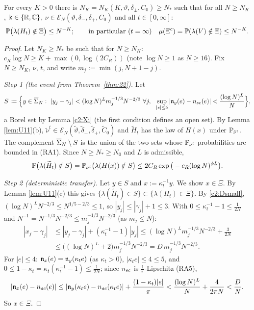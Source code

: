 \begin{lemma}\label{lem:goodC}
For every $K>0$ there is $N_K=N_K(K,\vartheta,\delta_\pm,C_0)\ge N_*$ such that for all $N\ge N_K$, $\K\in\{\R,\C\}$, $\nu\in\mathcal E_N(\vartheta,\delta_-,\delta_+,C_0)$ and all $t\in[0,\infty]$:
\[
\P\big(\lambda(H_t)\notin\Xi\big)\le N^{-K};\qquad\text{in particular (}t=\infty\text{)}\quad\mu(\Xi^c)=\P(\lambda(V)\notin\Xi)\le N^{-K}.
\]
\end{lemma}

\begin{proof}
Let $N_K\ge N_*$ be such that for $N\ge N_K$: $c_R\log N\ge K+\max(0,\log(2C_R))$ (note $\log N\ge1$ as $N\ge16$). Fix $N\ge N_K$, $\nu$, $t$, and write $m_j:=\min(j,N+1-j)$.

\emph{Step 1 (the event from Theorem~\ref{thm:22}).} Let
\[
S:=\Big\{y\in\cSig:\ |y_j-\gamma_j|<(\log N)^Lm_j^{-1/3}N^{-2/3}\ \forall j,\ \ \sup_{|e|\le5}|\fn_y(e)-\nsc(e)|<\frac{(\log N)^L}N\Big\},
\]
a Borel set by Lemma \ref{c2:Xi} (the first condition defines an open set). By Lemma \ref{lem:U11}(b), $\tilde\nu^t\in\mathcal E_N(\tilde\vartheta,\tilde\delta_-,\tilde\delta_+,\tilde C_0)$ and $\widetilde H_t$ has the law of $H(x)$ under $\PP_{\tilde\nu^t}$.
The complement $\cSig\setminus S$ is the union of the two sets whose $\PP_{\tilde\nu^t}$-probabilities are bounded in (RA1). Since $N\ge N_*\ge N_0$ and $L$ is admissible,
\[
\P\big(\lambda(\widetilde H_t)\notin S\big)=\PP_{\tilde\nu^t}\big(\lambda(H(x))\notin S\big)\le2C_R\exp\big(-c_R(\log N)^{\phi L}\big).
\]

\emph{Step 2 (deterministic transfer).} Let $y\in S$ and $x:=\kappa_t^{-1}y$. We show $x\in\Xi$. By Lemma \ref{lem:U11}(c) this gives $\{\lambda(\widetilde H_t)\in S\}\subset\{\lambda(H_t)\in\Xi\}$.
By \eqref{c2:Dsmall}, $(\log N)^LN^{-2/3}\le N^{1/5-2/3}\le1$, so $|y_j|\le|\gamma_j|+1\le3$. With $0\le\kappa_t^{-1}-1\le\frac1{2N}$ and $N^{-1}=N^{-1/3}N^{-2/3}\le m_j^{-1/3}N^{-2/3}$ (as $m_j\le N$):
\begin{align*}
|x_j-\gamma_j|&\le|y_j-\gamma_j|+(\kappa_t^{-1}-1)|y_j|\le(\log N)^Lm_j^{-1/3}N^{-2/3}+\tfrac3{2N}\\
&\le\big((\log N)^L+2\big)m_j^{-1/3}N^{-2/3}=D\,m_j^{-1/3}N^{-2/3}.
\end{align*}
For $|e|\le4$: $\fn_x(e)=\fn_y(\kappa_te)$ (as $\kappa_t>0$), $|\kappa_te|\le4\le5$, and $0\le1-\kappa_t=\kappa_t(\kappa_t^{-1}-1)\le\frac1{2N}$; since $\nsc$ is $\frac1\pi$-Lipschitz (RA5),
\[
|\fn_x(e)-\nsc(e)|\le|\fn_y(\kappa_te)-\nsc(\kappa_te)|+\frac{(1-\kappa_t)|e|}{\pi}<\frac{(\log N)^L}N+\frac{4}{2\pi N}<\frac DN .
\]
So $x\in\Xi$.


\end{proof}
